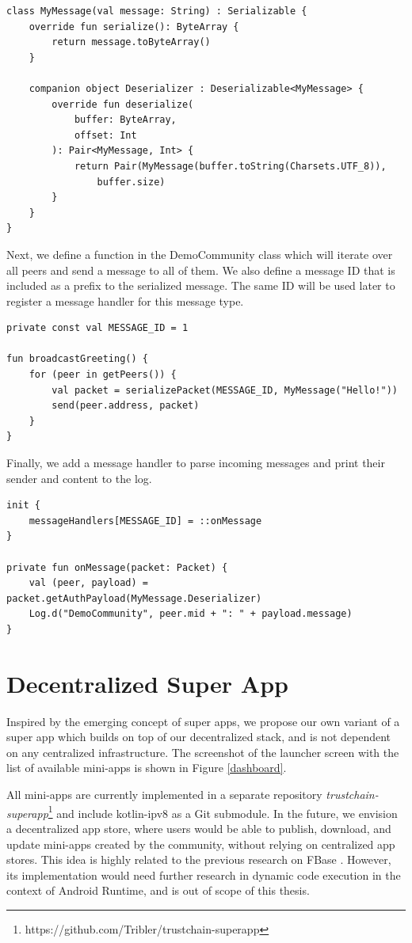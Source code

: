 \begin{verbatim}
class MyMessage(val message: String) : Serializable {
    override fun serialize(): ByteArray {
        return message.toByteArray()
    }

    companion object Deserializer : Deserializable<MyMessage> {
        override fun deserialize(
            buffer: ByteArray,
            offset: Int
        ): Pair<MyMessage, Int> {
            return Pair(MyMessage(buffer.toString(Charsets.UTF_8)),
                buffer.size)
        }
    }
}
\end{verbatim}

Next, we define a function in the DemoCommunity class which will iterate over all peers and send a message to all of them. We also define a message ID that is included as a prefix to the serialized message. The same ID will be used later to register a message handler for this message type.

\begin{verbatim}
private const val MESSAGE_ID = 1

fun broadcastGreeting() {
    for (peer in getPeers()) {
        val packet = serializePacket(MESSAGE_ID, MyMessage("Hello!"))
        send(peer.address, packet)
    }
}
\end{verbatim}

Finally, we add a message handler to parse incoming messages and print their sender and content to the log.

\begin{verbatim}
init {
    messageHandlers[MESSAGE_ID] = ::onMessage
}

private fun onMessage(packet: Packet) {
    val (peer, payload) = packet.getAuthPayload(MyMessage.Deserializer)
    Log.d("DemoCommunity", peer.mid + ": " + payload.message)
}
\end{verbatim}

\fi


\chapter{Decentralized Super App}
\label{superapp}

Inspired by the emerging concept of super apps, we propose our own variant of a super app which builds on top of our decentralized stack, and is not dependent on any centralized infrastructure. The screenshot of the launcher screen with the list of available mini-apps is shown in Figure \ref{dashboard}.

All mini-apps are currently implemented in a separate repository \textit{trustchain-superapp}\footnote{https://github.com/Tribler/trustchain-superapp} and include kotlin-ipv8 as a Git submodule. In the future, we envision a decentralized app store, where users would be able to publish, download, and update mini-apps created by the community, without relying on centralized app stores. This idea is highly related to the previous research on FBase \cite{fbase}. However, its implementation would need further research in dynamic code execution in the context of Android Runtime, and is out of scope of this thesis.

